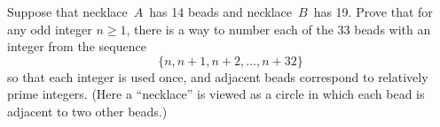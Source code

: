 Suppose that necklace $\, A \,$ has 14 beads and necklace $\, B \,$ has 19. Prove that for any odd integer $n \geq 1$,  there is a way to number each of the 33 beads with an integer from the sequence \[ \{ n, n+1, n+2, \dots, n+32 \}  \] so that each integer is used once, and adjacent beads correspond to relatively prime integers. (Here a ``necklace'' is viewed as a circle in which each bead is adjacent to two other beads.)
